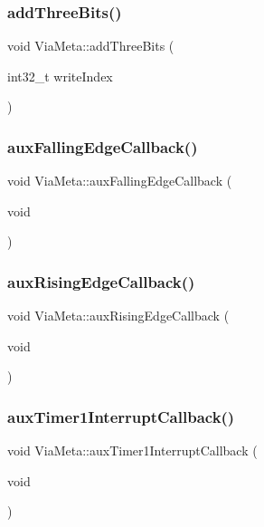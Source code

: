 \subsubsection{\texorpdfstring{add\+Three\+Bits()}{addThreeBits()}}
{\footnotesize\ttfamily void Via\+Meta\+::add\+Three\+Bits (\begin{DoxyParamCaption}\item[{int32\+\_\+t}]{write\+Index }\end{DoxyParamCaption})}

\mbox{\label{class_via_meta_ae3ee604199052c98b3686b05415080f1}} 
\subsubsection{\texorpdfstring{aux\+Falling\+Edge\+Callback()}{auxFallingEdgeCallback()}}
{\footnotesize\ttfamily void Via\+Meta\+::aux\+Falling\+Edge\+Callback (\begin{DoxyParamCaption}\item[{void}]{ }\end{DoxyParamCaption})}

\mbox{\label{class_via_meta_a0f19cd6bdf23ade9a83841e81d519e0c}} 
\subsubsection{\texorpdfstring{aux\+Rising\+Edge\+Callback()}{auxRisingEdgeCallback()}}
{\footnotesize\ttfamily void Via\+Meta\+::aux\+Rising\+Edge\+Callback (\begin{DoxyParamCaption}\item[{void}]{ }\end{DoxyParamCaption})}

\mbox{\label{class_via_meta_aa11eb2d9719091cb03f50d7f4172509c}} 
\subsubsection{\texorpdfstring{aux\+Timer1\+Interrupt\+Callback()}{auxTimer1InterruptCallback()}}
{\footnotesize\ttfamily void Via\+Meta\+::aux\+Timer1\+Interrupt\+Callback (\begin{DoxyParamCaption}\item[{void}]{ }\end{DoxyParamCaption})}

